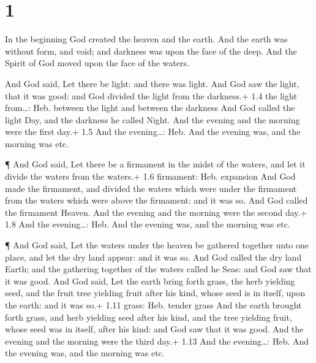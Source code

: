 \hypertarget{section}{%
\section{1}\label{section}}

 In the beginning God created the heaven and the earth.
 And the earth was without form, and void; and darkness was
upon the face of the deep. And the Spirit of God moved upon the face of
the waters.

 And God said, Let there be light: and there was light.
 And God saw the light, that it was good: and God divided
the light from the darkness.+ 1.4 the light from\ldots: Heb. between the
light and between the darkness  And God called the light
Day, and the darkness he called Night. And the evening and the morning
were the first day.+ 1.5 And the evening\ldots: Heb. And the evening
was, and the morning was etc.

 ¶ And God said, Let there be a firmament in the midst of
the waters, and let it divide the waters from the waters.+ 1.6
firmament: Heb. expansion  And God made the firmament, and
divided the waters which were under the firmament from the waters which
were above the firmament: and it was so.  And God called the
firmament Heaven. And the evening and the morning were the second day.+
1.8 And the evening\ldots: Heb. And the evening was, and the morning was
etc.

 ¶ And God said, Let the waters under the heaven be gathered
together unto one place, and let the dry land appear: and it was so.
 And God called the dry land Earth; and the gathering
together of the waters called he Seas: and God saw that it was good.
 And God said, Let the earth bring forth grass, the herb
yielding seed, and the fruit tree yielding fruit after his kind, whose
seed is in itself, upon the earth: and it was so.+ 1.11 grass: Heb.
tender grass  And the earth brought forth grass, and herb
yielding seed after his kind, and the tree yielding fruit, whose seed
was in itself, after his kind: and God saw that it was good.
 And the evening and the morning were the third day.+ 1.13
And the evening\ldots: Heb. And the evening was, and the morning was
etc.

